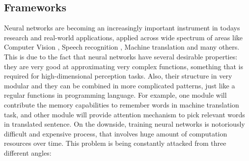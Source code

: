 \subsection{Frameworks}


Neural networks are becoming an increasingly important instrument in todays research and
real-world applications, applied across wide spectrum of areas like Computer Vision \cite{AlexNet},
Speech recognition \cite{hannun2014deep}, Machine translation \cite{wu2016google} and many others.
This is due to the fact that neural networks have several desirable properties: they are very
good at approximating very complex functions, something that is required for high-dimensional
perception tasks. Also, their structure in very modular and they can be combined in
more complicated patterns, just like a regular functions in programming language. For example,
one module will contribute the memory capabilities to remember words in machine translation
task, and other module will provide attention mechanism to pick relevant words in translated
sentence.
On the downside, training neural networks is notoriously difficult and expensive process,
that involves huge amount of computation resources over time.
This problem is being constantly attacked from three different angles:
